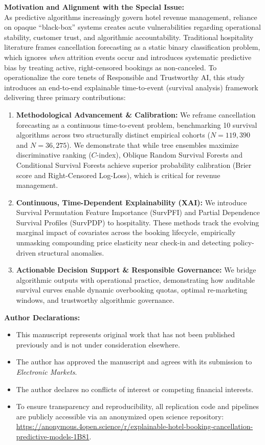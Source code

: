 \documentclass[10.5pt,a4paper]{article}
\begin{document}
\textbf{Motivation and Alignment with the Special Issue:} \\
As predictive algorithms increasingly govern hotel revenue management, reliance on opaque ``black-box'' systems creates acute vulnerabilities regarding operational stability, customer trust, and algorithmic accountability. Traditional hospitality literature frames cancellation forecasting as a static binary classification problem, which ignores \textit{when} attrition events occur and introduces systematic predictive bias by treating active, right-censored bookings as non-canceled. To operationalize the core tenets of Responsible and Trustworthy AI, this study introduces an end-to-end explainable time-to-event (survival analysis) framework delivering three primary contributions:
\begin{enumerate}
    \setlength{\itemsep}{1pt}
    \setlength{\parskip}{1pt}
    \item \textbf{Methodological Advancement \& Calibration:} We reframe cancellation forecasting as a continuous time-to-event problem, benchmarking 10 survival algorithms across two structurally distinct empirical cohorts ($N = 119{,}390$ and $N = 36{,}275$). We demonstrate that while tree ensembles maximize discriminative ranking ($C$-index), Oblique Random Survival Forests and Conditional Survival Forests achieve superior probability calibration (Brier score and Right-Censored Log-Loss), which is critical for revenue management.
    \item \textbf{Continuous, Time-Dependent Explainability (XAI):} We introduce Survival Permutation Feature Importance (SurvPFI) and Partial Dependence Survival Profiles (SurvPDP) to hospitality. These methods track the evolving marginal impact of covariates across the booking lifecycle, empirically unmasking compounding price elasticity near check-in and detecting policy-driven structural anomalies.
    \item \textbf{Actionable Decision Support \& Responsible Governance:} We bridge algorithmic outputs with operational practice, demonstrating how auditable survival curves enable dynamic overbooking quotas, optimal re-marketing windows, and trustworthy algorithmic governance.
\end{enumerate}

\textbf{Author Declarations:}
\begin{itemize}
    \setlength{\itemsep}{1pt}
    \setlength{\parskip}{1pt}
    \item This manuscript represents original work that has not been published previously and is not under consideration elsewhere.
    \item The author has approved the manuscript and agrees with its submission to \textit{Electronic Markets}.
    \item The author declares no conflicts of interest or competing financial interests.
    \item To ensure transparency and reproducibility, all replication code and pipelines are publicly accessible via an anonymized open science repository: \url{https://anonymous.4open.science/r/explainable-hotel-booking-cancellation-predictive-models-1B81}.
\end{itemize}
\end{document}

